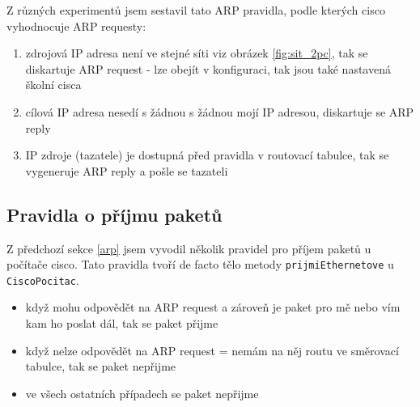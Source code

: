 Z různých experimentů jsem sestavil tato ARP pravidla, podle kterých cisco vyhodnocuje ARP requesty:
\begin{enumerate}
 \item zdrojová IP adresa není ve stejné síti viz obrázek \ref{fig:sit_2pc}, tak se diskartuje ARP request - lze obejít v konfiguraci, tak jsou také nastavená školní cisca
 \item cílová IP adresa nesedí s žádnou s žádnou mojí IP adresou, diskartuje se ARP reply
 \item IP zdroje (tazatele) je dostupná před pravidla v routovací tabulce, tak se vygeneruje ARP reply a pošle se tazateli
\end{enumerate}


\subsection{Pravidla o příjmu paketů} 
Z předchozí sekce \ref{arp} jsem vyvodil několik pravidel pro příjem paketů u počítače cisco. Tato pravidla tvoří de facto tělo metody \verb|prijmiEthernetove| u \verb|CiscoPocitac|.

\begin{itemize}
 \item když mohu odpovědět na ARP request a zároveň je paket pro mě nebo vím kam ho poslat dál, tak se paket přijme
 \item když nelze odpovědět na ARP request = nemám na něj routu ve směrovací tabulce, tak se paket nepřijme
 \item ve všech ostatních případech se paket nepřijme
\end{itemize}



